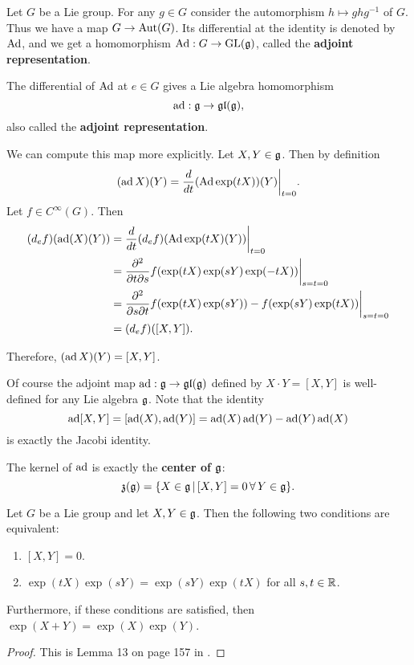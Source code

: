 \documentclass[11pt, english]{article}
\begin{document}
Let $G$ be a Lie group. For any $g \in G$ consider the automorphism $h \mapsto ghg^{-1}$ of $G$. Thus we have a map $G \to \operatorname{Aut}(G)$. Its differential at the identity is denoted by $\operatorname{Ad}$, and we get a homomorphism ${\operatorname{Ad}:G \to \operatorname{GL}(\mathfrak g)}$, called the \textbf{adjoint representation}.

The differential of $\operatorname{Ad}$ at $e \in G$ gives a Lie algebra homomorphism
$$
\operatorname{ad}:\mathfrak g \to \mathfrak{gl}(\mathfrak g),
$$
also called the \textbf{adjoint representation}. 

We can compute this map more explicitly. Let $X,Y \in \mathfrak g$. Then by definition
$$
(\ad X)(Y) = \restr{\frac{d}{dt}( \Ad \exp(tX))(Y)}{t=0}.
$$
Let $f \in C^\infty(G)$. Then
\begin{align*}
  (d_ef)(\ad(X)(Y)) &= \restr{\frac{d}{dt} (d_ef)( \Ad \exp(tX)(Y))}{t=0} \\
&= \restr{\frac{\partial^2}{\partial t \partial s}f(\exp(tX)\exp(sY)\exp(-tX) )}{s=t=0} \\
&= \restr{\frac{\partial^2}{\partial s \partial t} f(\exp(tX)\exp(sY))-f(\exp (sY)\exp(tX))}{s=t=0} \\
&= (d_ef)([X,Y]).
\end{align*}

Therefore, $(\operatorname{ad} X)(Y) = [X,Y]$.

Of course  the adjoint map $\operatorname{ad}: \mathfrak g \to \mathfrak{gl}(\mathfrak g)$ defined by $X \cdot Y = [X,Y]$ is well-defined for any Lie algebra $\mathfrak g$. Note that the identity 
$$
\operatorname{ad} [X,Y] = [\operatorname{ad} (X), \operatorname{ad}(Y)] = \operatorname{ad}(X) \operatorname{ad} (Y) - \operatorname{ad}(Y) \operatorname{ad}(X)
$$
is exactly the Jacobi identity.

The kernel of $\operatorname{ad}$ is exactly the \textbf{center of $\mathfrak g$}:
$$
\mathfrak{z}(\mathfrak g) = \{ X \in \mathfrak g \, | \, [X,Y] = 0 \, \forall \, Y \in \mathfrak g \}.
$$

\begin{prop}
\label{propcommute}
  Let $G$ be a Lie group and let $X,Y \in \mathfrak g$. Then the following two conditions are equivalent:
  \begin{enumerate}
  \item $[X,Y]=0$.
\item $\exp(tX)\exp(sY) = \exp(sY) \exp(tX)$ for all $s,t \in \mathbb{R}$.
  \end{enumerate}

Furthermore, if these conditions are satisfied, then $\exp(X+Y) = \exp(X)\exp(Y)$.
\end{prop}

\begin{proof}
This is Lemma 13 on page 157 in \cite{spivak_manifolds}.
\end{proof}
\end{document}
